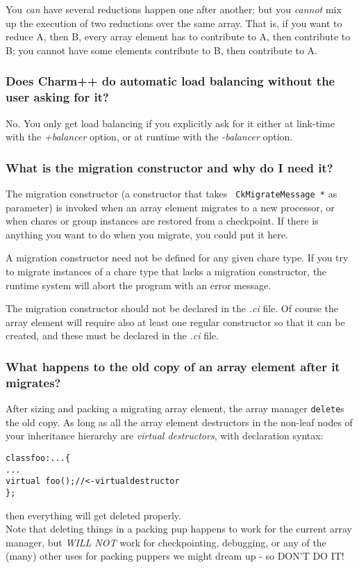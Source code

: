 You {\em can} have several reductions happen one after another; but
you {\em cannot} mix up the execution of two reductions over the same
array. That is, if you want to reduce A, then B, every array element has
to contribute to A, then contribute to B; you cannot have some elements
contribute to B, then contribute to A.

\subsubsection{Does Charm++ do automatic load balancing without the user asking
for it?}

No. You only get load balancing if you explicitly ask for it either at link-time
with the {\em +balancer} option, or at runtime with the {\em -balancer} option.

\subsubsection{What is the migration constructor and why do I need it?}

The migration constructor (a constructor that takes {\tt
  CkMigrateMessage *} as parameter) is invoked when an array element
migrates to a new processor, or when chares or group instances are
restored from a checkpoint. If there is anything you want to do when
you migrate, you could put it here.

A migration constructor need not be defined for any given chare
type. If you try to migrate instances of a chare type that lacks a
migration constructor, the runtime system will abort the program with
an error message.

The migration constructor should not be declared in the {\em .ci} file. Of
course the array element will require also at least one regular constructor so
that it can be created, and these must be declared in the {\em .ci} file.

\subsubsection{What happens to the old copy of an array element after it migrates?}

After sizing and packing a migrating array element, the array manager
{\tt delete}s
the old copy. As long as all the array element destructors in the non-leaf
nodes of your inheritance hierarchy are {\em virtual destructors}, with
declaration syntax:
\begin{alltt}
class foo : ... \{
  ...
  virtual ~foo(); // <- virtual destructor
\};
\end{alltt}
then everything will get deleted properly.\\
Note that deleting things in a packing pup happens to work for the
current array manager, but {\em WILL NOT} work for checkpointing, debugging,
or any of the (many) other uses for packing puppers we might dream up -
so DON'T DO IT!

